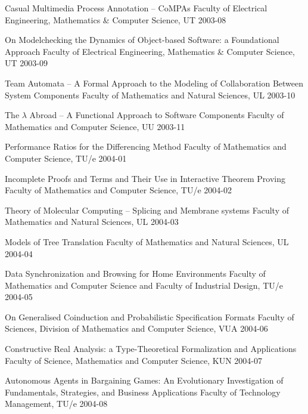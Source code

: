 \begin{multicols}{2}
	 {Casual Multimedia Process Annotation -- CoMPAs}
         {Faculty of Electrical Engineering, Mathematics \& Computer Science, UT}
         {2003-08}

	 {On Modelchecking the Dynamics of Object-based Software: a Foundational
         Approach}
         {Faculty of Electrical Engineering, Mathematics \& Computer Science, UT}
         {2003-09}

	 {Team Automata -- A Formal Approach to the Modeling of Collaboration Between          System Components}
         {Faculty of Mathematics and Natural Sciences, UL}
         {2003-10}


	 {The $\lambda$ Abroad -- A Functional Approach to Software Components}
         {Faculty of Mathematics and Computer Science, UU}
         {2003-11}

	 {Performance Ratios for the Differencing Method}
         {Faculty of Mathematics and Computer Science, TU/e}
         {2004-01}  

	 {Incomplete Proofs and Terms and Their Use in Interactive Theorem Proving}
         {Faculty of Mathematics and Computer Science, TU/e}
         {2004-02}


	 {Theory of Molecular Computing -- Splicing and Membrane systems}
         {Faculty of Mathematics and Natural Sciences, UL}
         {2004-03}

	 {Models of Tree Translation}
         {Faculty of Mathematics and Natural Sciences, UL}
         {2004-04}

	 {Data Synchronization and Browsing for Home Environments}
         {Faculty of Mathematics and Computer Science and Faculty of Industrial Design, TU/e}
         {2004-05}

	 {On Generalised Coinduction and Probabilistic Specification Formats}
         {Faculty of Sciences, Division of Mathematics and Computer Science, VUA}
         {2004-06}

         {Constructive Real Analysis: a Type-Theoretical Formalization and Applications}
         {Faculty of Science, Mathematics and Computer Science, KUN}
         {2004-07}

	 {Autonomous Agents in Bargaining Games: An Evolutionary Investigation of Fundamentals, Strategies, and Business Applications}
         {Faculty of Technology Management, TU/e}
         {2004-08}
	

\end{multicols}
